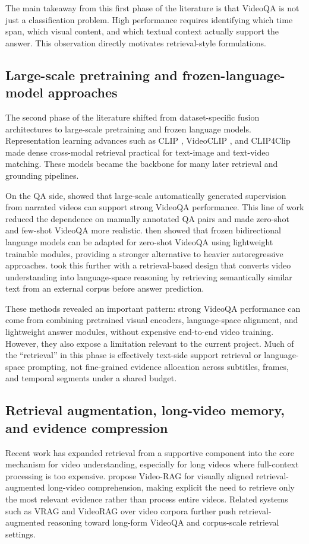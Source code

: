 \documentclass{article}
\begin{document}
The main takeaway from this first phase of the literature is that VideoQA is not just a classification problem.
High performance requires identifying which time span, which visual content, and which textual context actually support the answer.
This observation directly motivates retrieval-style formulations.

\subsection{Large-scale pretraining and frozen-language-model approaches}
The second phase of the literature shifted from dataset-specific fusion architectures to large-scale pretraining and frozen language models.
Representation learning advances such as CLIP \citep{radford2021clip}, VideoCLIP \citep{xu2021videoclip}, and CLIP4Clip \citep{luo2021clip4clip} made dense cross-modal retrieval practical for text-image and text-video matching.
These models became the backbone for many later retrieval and grounding pipelines.

On the QA side, \citet{yang2021justask} showed that large-scale automatically generated supervision from narrated videos can support strong VideoQA performance.
This line of work reduced the dependence on manually annotated QA pairs and made zero-shot and few-shot VideoQA more realistic.
\citet{yang2022frozenbilm} then showed that frozen bidirectional language models can be adapted for zero-shot VideoQA using lightweight trainable modules, providing a stronger alternative to heavier autoregressive approaches.
\citet{pan2023r2a} took this further with a retrieval-based design that converts video understanding into language-space reasoning by retrieving semantically similar text from an external corpus before answer prediction.

These methods revealed an important pattern: strong VideoQA performance can come from combining pretrained visual encoders, language-space alignment, and lightweight answer modules, without expensive end-to-end video training.
However, they also expose a limitation relevant to the current project.
Much of the ``retrieval'' in this phase is effectively text-side support retrieval or language-space prompting, not fine-grained evidence allocation across subtitles, frames, and temporal segments under a shared budget.

\subsection{Retrieval augmentation, long-video memory, and evidence compression}
Recent work has expanded retrieval from a supportive component into the core mechanism for video understanding, especially for long videos where full-context processing is too expensive.
\citet{luo2024videorag} propose Video-RAG for visually aligned retrieval-augmented long-video comprehension, making explicit the need to retrieve only the most relevant evidence rather than process entire videos.
Related systems such as VRAG \citep{gia2025vrag} and VideoRAG over video corpora \citep{jeong2025videorag} further push retrieval-augmented reasoning toward long-form VideoQA and corpus-scale retrieval settings.
\end{document}
